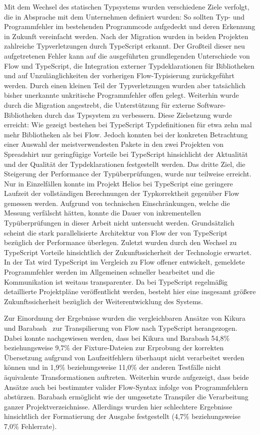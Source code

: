 Mit dem Wechsel des statischen Typsystems wurden verschiedene Ziele verfolgt, die in Absprache mit dem Unternehmen definiert wurden:
So sollten Typ- und Programmfehler im bestehenden Programmcode aufgedeckt und deren Erkennung in Zukunft vereinfacht werden. Nach der Migration wurden in beiden Projekten zahlreiche Typverletzungen durch TypeScript erkannt. Der Großteil dieser neu aufgetretenen Fehler kann auf die ausgeführten grundlegenden Unterschiede von Flow und TypeScript, die Integration externer Typdeklarationen für Bibliotheken und auf Unzulänglichkeiten der vorherigen Flow-Typisierung zurückgeführt werden. Durch einen kleinen Teil der Typverletzungen wurden aber tatsächlich bisher unerkannte unkritische Programmfehler offen gelegt.
Weiterhin wurde durch die Migration angestrebt, die Unterstützung für externe Software-Bibliotheken durch das Typsystem zu verbessern. Diese Zielsetzung wurde erreicht: Wie gezeigt bestehen bei TypeScript Typdefinitionen für etwa zehn mal mehr Bibliotheken als bei Flow. Jedoch konnten bei der konkreten Betrachtung einer Auswahl der meistverwendesten Pakete in den zwei Projekten von Spreadshirt nur geringfügige Vorteile bei TypeScript hinsichlicht der Aktualität und der Qualität der Typdeklarationen festgestellt werden.
Das dritte Ziel, die Steigerung der Performance der Typüberprüfungen, wurde nur teilweise erreicht. Nur in Einzelfällen konnte im Projekt Helios bei TypeScript eine geringere Laufzeit der vollständigen Berechnungen der Typkorrektheit gegenüber Flow gemessen werden. Aufgrund von technischen Einschränkungen, welche die Messung verfälscht hätten, konnte die Dauer von inkrementellen Typüberprüfungen in dieser Arbeit nicht untersucht werden. Grundsätzlich scheint die stark parallelisierte Architektur von Flow der von TypeScript bezüglich der Performance überlegen.
Zuletzt wurden durch den Wechsel zu TypeScript Vorteile hinsichtlich der Zukunftssicherheit der Technologie erwartet. In der Tat wird TypeScript im Vergleich zu Flow offener entwickelt, gemeldete Programmfehler werden im Allgemeinen schneller bearbeitet und die Kommunikation ist weitaus transparenter. Da bei TypeScript regelmäßig detaillierte Projektpläne veröffentlicht werden, besteht hier eine insgesamt größere Zukunftssicherheit bezüglich der Weiterentwicklung des Systems.

\enlargethispage{2\baselineskip}
Zur Einordnung der Ergebnisse wurden die vergleichbaren Ansätze von Kikura~\autocite{KIKURA:FLOW_TO_TS} und Barabash~\autocite{BARABASH:FLOW_TO_TS} zur Transpilierung von Flow nach TypeScript herangezogen. Dabei konnte nachgewiesen werden, dass bei Kikura und Barabash 54,8\% beziehungsweise 9,7\% der Fixture-Dateien zur Erprobung der korrekten Übersetzung aufgrund von Laufzeitfehlern überhaupt nicht verarbeitet werden können und in 1,9\% beziehungsweise 11,0\% der anderen Testfälle nicht äquivalente Transformationen auftreten. Weiterhin wurde aufgezeigt, dass beide Ansätze auch bei bestimmter valider Flow-Syntax infolge von Programmfehlern abstürzen. Barabash ermöglicht wie der umgesetzte Transpiler die Verarbeitung ganzer Projektverzeichnisse. Allerdings wurden hier schlechtere Ergebnisse hinsichtlich der Formatierung der Ausgabe festgestellt (4,7\% beziehungsweise 7,0\% Fehlerrate).

